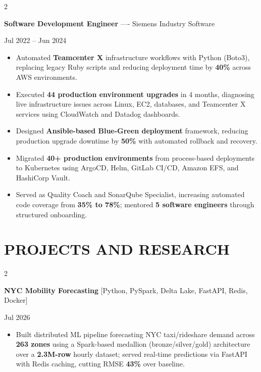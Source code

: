 \documentclass[10pt, letterpaper]{article}
\newenvironment{highlights}{
    \begin{itemize}[
        topsep=0.10 cm,
        parsep=0.06 cm,
        partopsep=0pt,
        itemsep=0.06 cm,
        leftmargin=12pt
    ]
}{
    \end{itemize}
}
\newenvironment{twocolentry}[2][]{
    \onecolentry
    \def\secondColumn{#2}
    \setcolumnwidth{\fill, 4.5 cm}
    \begin{paracol}{2}
}{
    \switchcolumn \raggedleft \secondColumn
    \end{paracol}
    \endonecolentry
}
\begin{document}
\vspace{0.15 cm}

\begin{twocolentry}{Jul 2022 -- Jun 2024}
\textbf{Software Development Engineer} ---- Siemens Industry Software
\end{twocolentry}
\begin{highlights}
  \item Automated \textbf{Teamcenter X} infrastructure workflows with Python (Boto3), replacing legacy Ruby scripts and reducing deployment time by \textbf{40\%} across AWS environments.
  \item Executed \textbf{44 production environment upgrades} in 4 months, diagnosing live infrastructure issues across Linux, EC2, databases, and Teamcenter X services using CloudWatch and Datadog dashboards.
  \item Designed \textbf{Ansible-based Blue-Green deployment} framework, reducing production upgrade downtime by \textbf{50\%} with automated rollback and recovery.
  \item Migrated \textbf{40+ production environments} from process-based deployments to Kubernetes using ArgoCD, Helm, GitLab CI/CD, Amazon EFS, and HashiCorp Vault.
  \item Served as Quality Coach and SonarQube Specialist, increasing automated code coverage from \textbf{35\% to 78\%}; mentored \textbf{5 software engineers} through structured onboarding.
\end{highlights}

\section{PROJECTS AND RESEARCH}
\begin{twocolentry}{Jul 2026}
\textbf{NYC Mobility Forecasting} [Python, PySpark, Delta Lake, FastAPI, Redis, Docker]
\end{twocolentry}
\begin{highlights}
  \item Built distributed ML pipeline forecasting NYC taxi/rideshare demand across \textbf{263 zones} using a Spark-based medallion (bronze/silver/gold) architecture over a \textbf{2.3M-row} hourly dataset; served real-time predictions via FastAPI with Redis caching, cutting RMSE \textbf{43\%} over baseline.
\end{highlights}

\vspace{0.12 cm}
\end{document}
